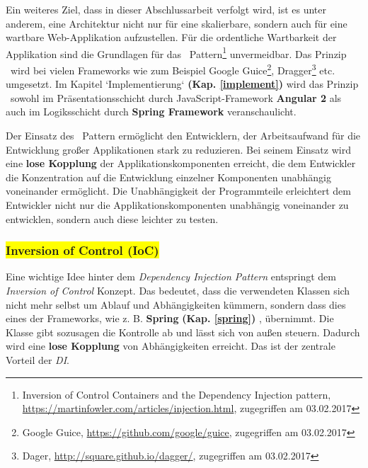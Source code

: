 Ein weiteres Ziel, dass in dieser Abschlussarbeit verfolgt wird, ist es unter anderem, eine Architektur nicht nur für eine skalierbare, sondern auch für eine wartbare Web-Applikation aufzustellen. Für die ordentliche Wartbarkeit der Applikation sind die Grundlagen für das \di\ Pattern\footnote{Inversion of Control Containers and the Dependency Injection pattern, \url{https://martinfowler.com/articles/injection.html}, zugegriffen am 03.02.2017} unvermeidbar. Das Prinzip \di\ wird bei vielen Frameworks wie zum Beispiel Google Guice\footnote{Google Guice, \url{https://github.com/google/guice}, zugegriffen am 03.02.2017}, Dragger\footnote{Dager, \url{http://square.github.io/dagger/}, zugegriffen am 03.02.2017} etc. umgesetzt. Im Kapitel `Implementierung` \textbf{(Kap. \ref{implement})} wird das Prinzip \di\ sowohl im Präsentationsschicht durch JavaScript-Framework \textbf{Angular 2} als auch im Logiksschicht durch \textbf{Spring Framework} veranschaulicht.

Der Einsatz des \di\ Pattern ermöglicht den Entwicklern, der Arbeitsaufwand für die Entwicklung großer Applikationen stark zu reduzieren. Bei seinem Einsatz wird eine \textbf{lose Kopplung} der Applikationskomponenten erreicht, die dem Entwickler die Konzentration auf die Entwicklung einzelner Komponenten unabhängig voneinander ermöglicht. Die Unabhängigkeit der Programmteile erleichtert dem Entwickler nicht nur die Applikationskomponenten unabhängig voneinander zu entwicklen, sondern auch diese leichter zu testen. 

\subsubsection{\colorbox{yellow}{Inversion of Control (IoC)}}

Eine wichtige Idee hinter dem \textit{Dependency Injection Pattern} entspringt dem \textit{Inversion of Control} Konzept. Das bedeutet, dass die verwendeten Klassen sich nicht mehr selbst um Ablauf und Abhängigkeiten kümmern, sondern dass dies eines der Frameworks, wie z. B. \textbf{Spring} \textbf{(Kap. \ref{spring})} , übernimmt. Die Klasse gibt sozusagen die Kontrolle ab und lässt sich von außen steuern. Dadurch wird eine \textbf{lose Kopplung} von Abhängigkeiten erreicht. Das ist der zentrale Vorteil der \textit{DI}.

